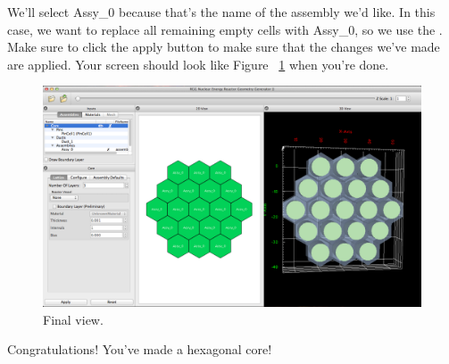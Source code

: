 We'll select Assy\_0 because that's the name of the assembly we'd like.  In this case, we want to replace all remaining empty cells with Assy\_0, so we use the . Make sure to click the apply button to make sure that the changes we've made are applied.  Your screen should look like Figure  ~\ref{fig:Hex20} when you're done.

\begin{figure}[H]
	\begin{center}
		\includegraphics[width=0.85\linewidth]{Images/hex-final-core.png}
		\caption{Final view.}
		\label{fig:Hex20}
	\end{center}
\end{figure}

Congratulations!  You've made a hexagonal core!